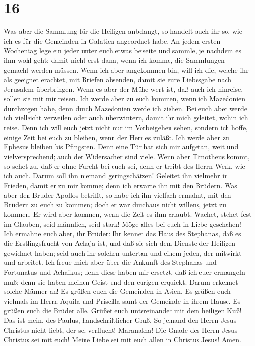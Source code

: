 \hypertarget{section-15}{%
\section{16}\label{section-15}}

 Was aber die Sammlung für die Heiligen anbelangt, so
handelt auch ihr so, wie ich es für die Gemeinden in Galatien angeordnet
habe.  An jedem ersten Wochentag lege ein jeder unter euch
etwas beiseite und sammle, je nachdem es ihm wohl geht; damit nicht erst
dann, wenn ich komme, die Sammlungen gemacht werden müssen.
 Wenn ich aber angekommen bin, will ich die, welche ihr
als geeignet erachtet, mit Briefen absenden, damit sie eure Liebesgabe
nach Jerusalem überbringen.  Wenn es aber der Mühe wert
ist, daß auch ich hinreise, sollen sie mit mir reisen. 
Ich werde aber zu euch kommen, wenn ich Mazedonien durchzogen habe, denn
durch Mazedonien werde ich ziehen.  Bei euch aber werde
ich vielleicht verweilen oder auch überwintern, damit ihr mich geleitet,
wohin ich reise.  Denn ich will euch jetzt nicht nur im
Vorbeigehen sehen, sondern ich hoffe, einige Zeit bei euch zu bleiben,
wenn der Herr es zuläßt.  Ich werde aber zu Ephesus
bleiben bis Pfingsten.  Denn eine Tür hat sich mir
aufgetan, weit und vielversprechend; auch der Widersacher sind viele.
 Wenn aber Timotheus kommt, so sehet zu, daß er ohne
Furcht bei euch sei, denn er treibt des Herrn Werk, wie ich auch.
 Darum soll ihn niemand geringschätzen! Geleitet ihn
vielmehr in Frieden, damit er zu mir komme; denn ich erwarte ihn mit den
Brüdern.  Was aber den Bruder Apollos betrifft, so habe
ich ihn vielfach ermahnt, mit den Brüdern zu euch zu kommen; doch er war
durchaus nicht willens, jetzt zu kommen. Er wird aber kommen, wenn die
Zeit es ihm erlaubt.  Wachet, stehet fest im Glauben,
seid männlich, seid stark!  Möge alles bei euch in Liebe
geschehen!  Ich ermahne euch aber, ihr Brüder: Ihr kennet
das Haus des Stephanas, daß es die Erstlingsfrucht von Achaja ist, und
daß sie sich dem Dienste der Heiligen gewidmet haben; 
seid auch ihr solchen untertan und einem jeden, der mitwirkt und
arbeitet.  Ich freue mich aber über die Ankunft des
Stephanas und Fortunatus und Achaikus; denn diese haben mir ersetzt, daß
ich euer ermangeln muß;  denn sie haben meinen Geist und
den eurigen erquickt. Darum erkennet solche Männer an! 
Es grüßen euch die Gemeinden in Asien. Es grüßen euch vielmals im Herrn
Aquila und Priscilla samt der Gemeinde in ihrem Hause. 
Es grüßen euch die Brüder alle. Grüßet euch untereinander mit dem
heiligen Kuß!  Das ist mein, des Paulus,
handschriftlicher Gruß.  So jemand den Herrn Jesus
Christus nicht liebt, der sei verflucht! Maranatha!  Die
Gnade des Herrn Jesus Christus sei mit euch!  Meine Liebe
sei mit euch allen in Christus Jesus! Amen.

